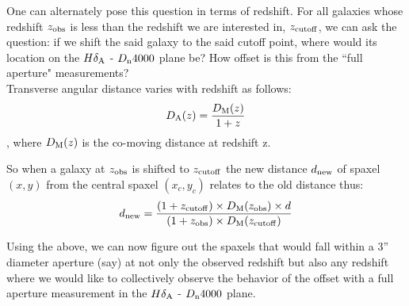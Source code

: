 
One can alternately pose this question in terms of redshift. For all galaxies whose redshift $z_{\rm obs}$ is less than the redshift we are interested in, $z_{\rm cutoff}$, we can ask the question: if we shift the said galaxy to the said cutoff point, where would its location on the $H\delta_{\rm A}$ - $D_{\rm n}4000$ plane be? How offset is this from the ``full aperture" measurements?\\

Transverse angular distance varies with redshift as follows:
$$D_{\rm A}(z) = \frac{D_{\rm M}(z)}{1+z} $$,
where $D_{\rm M}(z)$ is the co-moving distance at redshift z.

So when a galaxy at $z_{\rm obs}$ is shifted to $z_{\rm cutoff}$ the new distance $d_{\rm new}$ of spaxel $(x,y)$ from the central spaxel $(x_{c},y_{c})$ relates to the old distance thus:
$$ d_{\rm new} = \frac{(1+z_{\rm cutoff})\times D_{\rm M}(z_{\rm obs}) \times d}{(1+z_{\rm obs}) \times  D_{\rm M}(z_{\rm cutoff})} $$

Using the above, we can now figure out the spaxels that would fall within a 3'' diameter aperture (say) at not only the observed redshift but also any redshift where we would like to collectively observe the behavior of the offset with a full aperture measurement in the $H\delta_{\rm A}$ - $D_{\rm n}4000$ plane.

